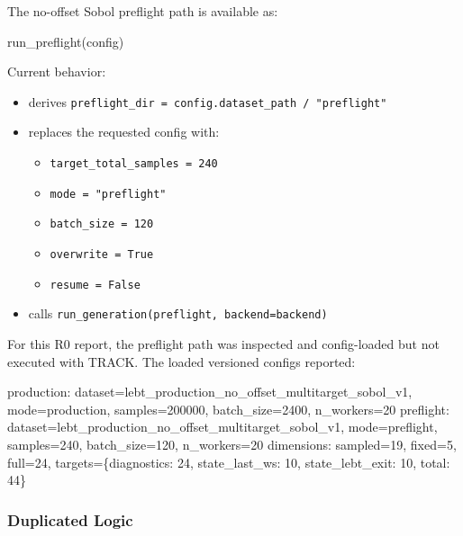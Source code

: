 \documentclass[
]{article}
\newenvironment{Shaded}{}{}
\newcommand{\NormalTok}[1]{#1}
\providecommand{\tightlist}{%
  \setlength{\itemsep}{0pt}\setlength{\parskip}{0pt}}
\begin{document}
The no-offset Sobol preflight path is available as:

\begin{Shaded}
\begin{Highlighting}[]
\NormalTok{run\_preflight(config)}
\end{Highlighting}
\end{Shaded}

Current behavior:

\begin{itemize}
\tightlist
\item
  derives
  \texttt{preflight\_dir\ =\ config.dataset\_path\ /\ "preflight"}
\item
  replaces the requested config with:

  \begin{itemize}
  \tightlist
  \item
    \texttt{target\_total\_samples\ =\ 240}
  \item
    \texttt{mode\ =\ "preflight"}
  \item
    \texttt{batch\_size\ =\ 120}
  \item
    \texttt{overwrite\ =\ True}
  \item
    \texttt{resume\ =\ False}
  \end{itemize}
\item
  calls \texttt{run\_generation(preflight,\ backend=backend)}
\end{itemize}

For this R0 report, the preflight path was inspected and config-loaded
but not executed with TRACK. The loaded versioned configs reported:

\begin{Shaded}
\begin{Highlighting}[]
\NormalTok{production: dataset=lebt\_production\_no\_offset\_multitarget\_sobol\_v1, mode=production, samples=200000, batch\_size=2400, n\_workers=20}
\NormalTok{preflight:  dataset=lebt\_production\_no\_offset\_multitarget\_sobol\_v1, mode=preflight,  samples=240,    batch\_size=120,  n\_workers=20}
\NormalTok{dimensions: sampled=19, fixed=5, full=24, targets=\{diagnostics: 24, state\_last\_ws: 10, state\_lebt\_exit: 10, total: 44\}}
\end{Highlighting}
\end{Shaded}

\hypertarget{duplicated-logic}{%
\subsubsection{Duplicated Logic}\label{duplicated-logic}}
\end{document}
